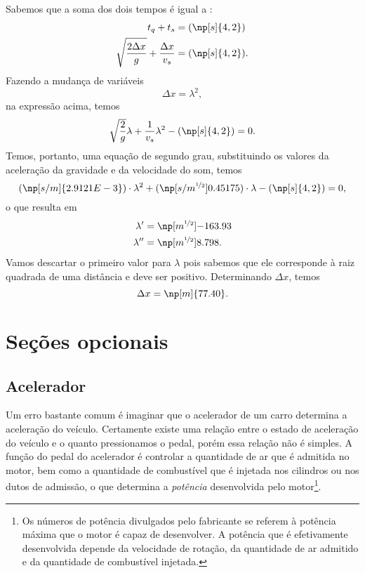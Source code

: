 Sabemos que a soma dos dois tempos é igual a :
\begin{align}
	t_q + t_s &= (\np[s]{4,2}) \\
	\sqrt{\frac{2 \Delta x}{g}} + \frac{\Delta x}{v_s} &= (\np[s]{4,2}).
\end{align}
%
Fazendo a mudança de variáveis
\begin{equation}
	\Delta x = \lambda^2,
\end{equation}
%
na expressão acima, temos
\begin{equation}
	\sqrt{\frac{2}{g}} \lambda + \frac{1}{v_s} \lambda^2 - (\np[s]{4,2}) = 0.
\end{equation}
%
Temos, portanto, uma equação de segundo grau, substituindo os valores da aceleração da gravidade e da velocidade do som, temos
\begin{equation}
	(\np[s/m]{2.9121E-3})\cdot \lambda^2 + (\np[s/m^{\nicefrac{1}{2}}]{0.45175})\cdot \lambda - (\np[s]{4,2}) = 0,
\end{equation}
%
o que resulta em
\begin{align}
	\lambda' &= \np[m^{\nicefrac{1}{2}}]{-163.93} \\
	\lambda''&= \np[m^{\nicefrac{1}{2}}]{8.798}.
\end{align}
%
Vamos descartar o primeiro valor para $\lambda$ pois sabemos que ele corresponde à raiz quadrada de uma distância e deve ser positivo. Determinando $\Delta x$, temos
\begin{equation}
	\Delta x = \np[m]{77.40}.
\end{equation}

\section{Seções opcionais}

\subsection{Acelerador}

Um erro bastante comum é imaginar que o acelerador de um carro determina a aceleração do veículo. Certamente existe uma relação entre o estado de aceleração do veículo e o quanto pressionamos o pedal, porém essa relação não é simples. A função do pedal do acelerador é controlar a quantidade de ar que é admitida no motor, bem como a quantidade de combustível que é injetada nos cilindros ou nos dutos de admissão, o que determina a \emph{potência} desenvolvida pelo motor\footnote{Os números de potência divulgados pelo fabricante se referem à potência máxima que o motor é capaz de desenvolver. A potência que é efetivamente desenvolvida depende da velocidade de rotação, da quantidade de ar admitido e da quantidade de combustível injetada.}.

